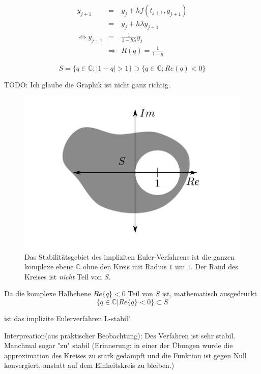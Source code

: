 \documentclass[10pt,a4paper]{article}
\begin{document}
\begin{bsp}

\begin{eqnarray*}
y_{j+1}&=&y_j + hf(t_{j+1},y_{j+1}) \\
&=& y_j + h \lambda y_{j+1} \\
\Leftrightarrow y_{j+1} &=& \frac{1}{1-h\lambda} y_j\\
& \Rightarrow & R(q)=\frac{1}{1-q}
\end{eqnarray*}

$$S=\{q \in \mathbb{C}; |1-q|>1 \} \supset \{ q \in \mathbb{C}; Re(q)<0\}$$

TODO: Ich glaube die Graphik ist nicht ganz richtig.

\begin{figure}[H]
\includegraphics[width=\textwidth]{images/stability_implicit_euler}
\caption{Das Stabilitätsgebiet des impliziten Euler-Verfahrens ist die ganzen komplexe ebene $\mathbb{C}$ ohne den Kreis mit Radius $1$ um $1$. Der Rand des Kreises ist \emph{nicht} Teil von $S$.}
\end{figure}

Da die komplexe Halbebene $Re\{ q\}<0$ Teil von $S$ ist, mathematisch ausgedrückt $$\{ q \in \mathbb{C} | Re \{ q\}<0 \} \subset S$$

ist das implizite Eulerverfahren L-stabil!

Interpreation(aus praktischer Beobachtung): Des Verfahren ist sehr stabil. Manchmal sogar "zu" stabil (Erinnerung: in einer der Übungen wurde die approximation des Kreises zu stark gedämpft und die Funktion ist gegen Null konvergiert, anstatt auf dem Einheitskreis zu bleiben.)

\end{bsp}
\end{document}
